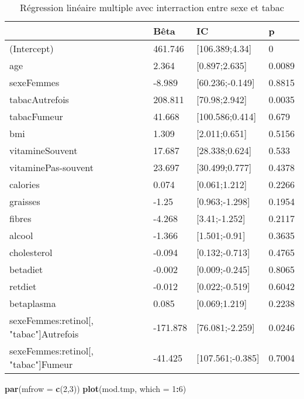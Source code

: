 \documentclass[]{article}
\newenvironment{Shaded}{\begin{snugshade}}{\end{snugshade}}
\newcommand{\KeywordTok}[1]{\textcolor[rgb]{0.13,0.29,0.53}{\textbf{#1}}}
\newcommand{\DataTypeTok}[1]{\textcolor[rgb]{0.13,0.29,0.53}{#1}}
\newcommand{\DecValTok}[1]{\textcolor[rgb]{0.00,0.00,0.81}{#1}}
\newcommand{\OperatorTok}[1]{\textcolor[rgb]{0.81,0.36,0.00}{\textbf{#1}}}
\newcommand{\NormalTok}[1]{#1}
\begin{document}
\begin{table}

\caption{\label{tab:unnamed-chunk-60}Régression linéaire multiple avec interraction entre sexe et tabac}
\centering
\begin{tabular}[t]{l|l|l|l}
\hline
  & Bêta & IC & p\\
\hline
\rowcolor[HTML]{BBD2E1}  (Intercept) & 461.746 & [106.389;4.34] & 0\\
\hline
age & 2.364 & [0.897;2.635] & 0.0089\\
\hline
\rowcolor[HTML]{BBD2E1}  sexeFemmes & -8.989 & [60.236;-0.149] & 0.8815\\
\hline
tabacAutrefois & 208.811 & [70.98;2.942] & 0.0035\\
\hline
\rowcolor[HTML]{BBD2E1}  tabacFumeur & 41.668 & [100.586;0.414] & 0.679\\
\hline
bmi & 1.309 & [2.011;0.651] & 0.5156\\
\hline
\rowcolor[HTML]{BBD2E1}  vitamineSouvent & 17.687 & [28.338;0.624] & 0.533\\
\hline
vitaminePas-souvent & 23.697 & [30.499;0.777] & 0.4378\\
\hline
\rowcolor[HTML]{BBD2E1}  calories & 0.074 & [0.061;1.212] & 0.2266\\
\hline
graisses & -1.25 & [0.963;-1.298] & 0.1954\\
\hline
\rowcolor[HTML]{BBD2E1}  fibres & -4.268 & [3.41;-1.252] & 0.2117\\
\hline
alcool & -1.366 & [1.501;-0.91] & 0.3635\\
\hline
\rowcolor[HTML]{BBD2E1}  cholesterol & -0.094 & [0.132;-0.713] & 0.4765\\
\hline
betadiet & -0.002 & [0.009;-0.245] & 0.8065\\
\hline
\rowcolor[HTML]{BBD2E1}  retdiet & -0.012 & [0.022;-0.519] & 0.6042\\
\hline
betaplasma & 0.085 & [0.069;1.219] & 0.2238\\
\hline
\rowcolor[HTML]{BBD2E1}  sexeFemmes:retinol[, "tabac"]Autrefois & -171.878 & [76.081;-2.259] & 0.0246\\
\hline
sexeFemmes:retinol[, "tabac"]Fumeur & -41.425 & [107.561;-0.385] & 0.7004\\
\hline
\end{tabular}
\end{table}

\begin{Shaded}
\begin{Highlighting}[]
\KeywordTok{par}\NormalTok{(}\DataTypeTok{mfrow =} \KeywordTok{c}\NormalTok{(}\DecValTok{2}\NormalTok{,}\DecValTok{3}\NormalTok{))}
\KeywordTok{plot}\NormalTok{(mod.tmp, }\DataTypeTok{which =} \DecValTok{1}\OperatorTok{:}\DecValTok{6}\NormalTok{)}
\end{Highlighting}
\end{Shaded}
\end{document}
